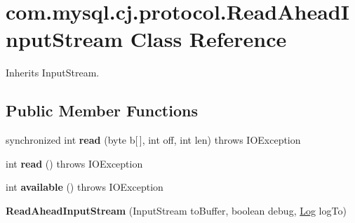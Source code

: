 \hypertarget{classcom_1_1mysql_1_1cj_1_1protocol_1_1_read_ahead_input_stream}{}\section{com.\+mysql.\+cj.\+protocol.\+Read\+Ahead\+Input\+Stream Class Reference}
\label{classcom_1_1mysql_1_1cj_1_1protocol_1_1_read_ahead_input_stream}


Inherits Input\+Stream.

\subsection*{Public Member Functions}
\begin{DoxyCompactItemize}
\item 
\mbox{\label{classcom_1_1mysql_1_1cj_1_1protocol_1_1_read_ahead_input_stream_a130f55bbeb99362583fe11b61a3f792a}} 
synchronized int {\bfseries read} (byte b\mbox{[}$\,$\mbox{]}, int off, int len)  throws I\+O\+Exception 
\item 
\mbox{\label{classcom_1_1mysql_1_1cj_1_1protocol_1_1_read_ahead_input_stream_a0810c5860c7fa43ffff24b5d2a5b4f27}} 
int {\bfseries read} ()  throws I\+O\+Exception 
\item 
\mbox{\label{classcom_1_1mysql_1_1cj_1_1protocol_1_1_read_ahead_input_stream_a42da53c32ffa008263b0e68b6a6a8577}} 
int {\bfseries available} ()  throws I\+O\+Exception 
\item 
\mbox{\label{classcom_1_1mysql_1_1cj_1_1protocol_1_1_read_ahead_input_stream_ae5435f386001c88ac355cf664961fcbb}} 
{\bfseries Read\+Ahead\+Input\+Stream} (Input\+Stream to\+Buffer, boolean debug, \mbox{\hyperlink{interfacecom_1_1mysql_1_1cj_1_1log_1_1_log}{Log}} log\+To)
\item 
\mbox{\label{classcom_1_1mysql_1_1cj_1_1protocol_1_1_read_ahead_input_stream_a542ea2a1e891f8cfff9b80c83f05b646}} 

\end{DoxyCompactItemize}
